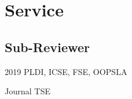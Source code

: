\documentclass[12pt,letterpaper]{report}
\newcommand{\listitemspace}{0.15em}
\renewenvironment{itemize}
{\begin{list}{}{\setlength{\leftmargin}{0em}
			\setlength{\parskip}{0em}
			\setlength{\itemsep}{\listitemspace}
			\setlength{\parsep}{\listitemspace}}}
	{\end{list}}
\begin{document}
%	
%	
%		
%		
%		
%		
%	
%	
%		
%		
%	
%	
%		
%		
	
	
	\section*{Service}
	
	\subsection*{Sub-Reviewer}
	\begin{tablist}
		\item[2019] \tab PLDI, ICSE, FSE, OOPSLA
		\item[Journal] \tab TSE
	\end{tablist}
	
\end{document}
